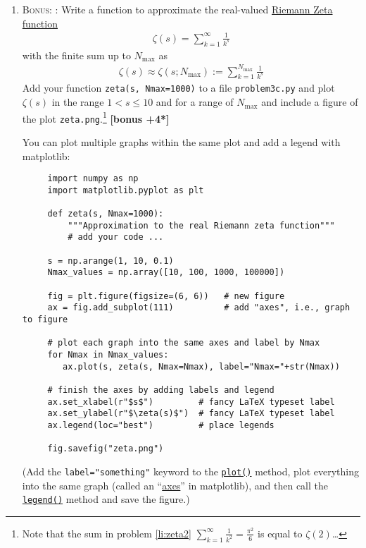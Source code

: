 \documentclass[letterpaper]{scrartcl}
\newcounter{TotalPoints}
\newcounter{TotalBonus}
\newcommand{\BONUS}{\textsc{Bonus: }}
\newcommand{\bonus}[1]{\textbf{[bonus +#1*]}\stepcounter{TotalBonus}}
\newcommand{\points}[1]{\textbf{[#1 points]}\stepcounter{TotalPoints}}
\newenvironment{enuma}{\begin{enumerate}[label=(\alph*)]}{\end{enumerate}}
\begin{document}
\begin{enuma}
\begin{gather}
    \label{eq:sum}
    S = \sqrt{\sum_{n=1}^{100} \frac{6}{n^{2}}}.
  \end{gather}
  Put your code into file \texttt{problem3b.py} and assign the result
  to a variable \texttt{mypi}. \points{2}
\item \label{li:zeta}\BONUS: Write a function to approximate the real-valued
  \href{http://mathworld.wolfram.com/RiemannZetaFunction.html}{Riemann
    Zeta function}
  \begin{gather}
    \label{eq:zeta}
    \zeta(s) = \sum_{k=1}^{\infty} \frac{1}{k^{s}}
  \end{gather}
  with the finite sum up to $N_{\text{max}}$ as
  \begin{gather}
    \label{eq:zetafinite}
    \zeta(s) \approx \zeta(s; N_{\text{max}}) := \sum_{k=1}^{N_{\text{max}}} \frac{1}{k^{s}}
  \end{gather}
  Add your function \texttt{zeta(s, Nmax=1000)} to a file
  \texttt{problem3c.py} and plot $\zeta(s)$ in the range
  $1 < s \leq 10$ and for a range of $N_{\text{max}}$ and include a
  figure of the plot \texttt{zeta.png}.\footnote{Note that the sum in
    problem \ref{li:zeta2}
    $\sum_{k=1}^{\infty} \frac{1}{k^{2}} = \frac{\pi^{2}}{6}$ is equal
    to $\zeta(2)$\dots} \bonus{4}
  
  You can plot multiple graphs within the same plot and add a legend
  with matplotlib:
  \begin{verbatim}
     import numpy as np 
     import matplotlib.pyplot as plt
     
     def zeta(s, Nmax=1000):
         """Approximation to the real Riemann zeta function"""
         # add your code ...

     s = np.arange(1, 10, 0.1)
     Nmax_values = np.array([10, 100, 1000, 100000])

     fig = plt.figure(figsize=(6, 6))   # new figure          
     ax = fig.add_subplot(111)          # add "axes", i.e., graph to figure

     # plot each graph into the same axes and label by Nmax
     for Nmax in Nmax_values:
        ax.plot(s, zeta(s, Nmax=Nmax), label="Nmax="+str(Nmax))

     # finish the axes by adding labels and legend
     ax.set_xlabel(r"$s$")         # fancy LaTeX typeset label
     ax.set_ylabel(r"$\zeta(s)$")  # fancy LaTeX typeset label
     ax.legend(loc="best")         # place legends

     fig.savefig("zeta.png")
   \end{verbatim}
  (Add the \texttt{label="something"} keyword to the
  \href{https://matplotlib.org/api/_as_gen/matplotlib.axes.Axes.plot.html#matplotlib.axes.Axes.plot}{\texttt{plot()}}
  method, plot everything into the same graph (called an
  ``\href{https://matplotlib.org/api/axes_api.html#axes-class}{axes}''
  in matplotlib), and then call the
  \href{https://matplotlib.org/api/_as_gen/matplotlib.axes.Axes.legend.html#matplotlib.axes.Axes.legend}{\texttt{legend()}}
  method and save the figure.)
\end{enuma}




\end{document}
